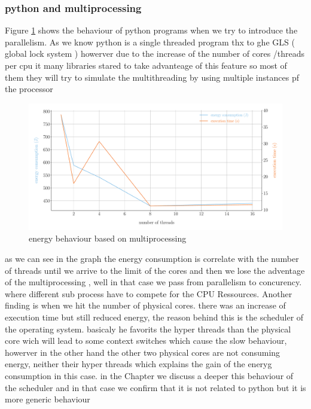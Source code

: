 \subsubsection{python and multiprocessing}
Figure \ref{fig:python_multiprocessing} shows the behaviour of python programs when we try to introduce the parallelism.
As we know python is a single threaded program thx to ghe GLS ( global lock system ) howerver due to the increase of the number of cores /threads per cpu it many libraries stared to take advanteage of this feature so most of them they will try to simulate the multithreading by using multiple instances pf the processor %

\begin{figure}[hbt]
    \centering
    \includegraphics[width=\linewidth]{imgs/multiprocessing_energyvstime}
    \caption{energy behaviour based on multiprocessing}
    \label{fig:python_multiprocessing}
\end{figure}

as we can see in the graph the energy consumption is correlate with the number of threads until we arrive to the limit of the cores and then we lose the adventage of the multiprocessing , well in that case we pass from parallelism to concurency. where different sub process have to compete for the CPU Ressources.
Another finding is when we hit the number of physical cores. there was an increase of execution time but still reduced energy, the reason behind this is the scheduler of the operating system. basicaly he favorits the hyper threads than the physical core wich will lead to some context switches which cause the slow behaviour, howerver in the other hand the other two physical cores are not consuming energy, neither their hyper threads which explains the gain of the eneryg consumption in this case.
in the Chapter %
we discuss a deeper this behaviour of the scheduler and in that case we confirm that it is not related to python but it is more generic behaviour %

